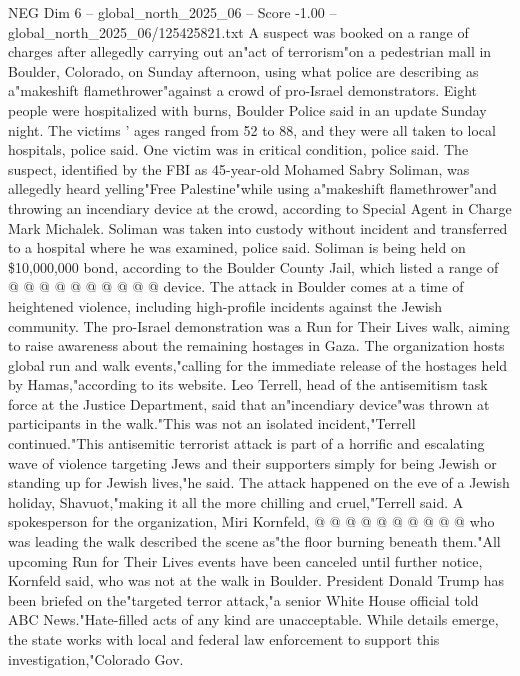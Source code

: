 \begin{textsample}{NEG Dim 6 – global\_north\_2025\_06 – Score -1.00 – global\_north\_2025\_06/125425821.txt}  \label{ex:f6_neg_436}
A suspect was booked on a range of charges after allegedly carrying out an"act of terrorism"on a pedestrian mall in Boulder, Colorado, on Sunday afternoon, using what police are describing as a"makeshift flamethrower"against a crowd of pro-Israel demonstrators.
Eight people were hospitalized with burns, Boulder Police said in an update Sunday night.
The victims ' ages ranged from 52 to 88, and they were all taken to local hospitals, police said.
One victim was in critical condition, police said.
The suspect, identified by the FBI as 45-year-old Mohamed Sabry Soliman, was allegedly heard yelling"Free Palestine"while using a"makeshift flamethrower"and throwing an incendiary device at the crowd, according to Special Agent in Charge Mark Michalek.
Soliman was taken into custody without incident and transferred to a hospital where he was examined, police said.
Soliman is being held on \$10,000,000 bond, according to the Boulder County Jail, which listed a range of @ @ @ @ @ @ @ @ @ @ device.
The attack in Boulder comes at a time of heightened violence, including high-profile incidents against the Jewish community.
The pro-Israel demonstration was a Run for Their Lives walk, aiming to raise awareness about the remaining hostages in Gaza.
The organization hosts global run and walk events,"calling for the immediate release of the hostages held by Hamas,"according to its website.
Leo Terrell, head of the antisemitism task force at the Justice Department, said that an"incendiary device"was thrown at participants in the walk."This was not an isolated incident,"Terrell continued."This antisemitic terrorist attack is part of a horrific and escalating wave of violence targeting Jews and their supporters simply for being Jewish or standing up for Jewish lives,"he said.
The attack happened on the eve of a Jewish holiday, Shavuot,"making it all the more chilling and cruel,"Terrell said.
A spokesperson for the organization, Miri Kornfeld, @ @ @ @ @ @ @ @ @ @ who was leading the walk described the scene as"the floor burning beneath them."All upcoming Run for Their Lives events have been canceled until further notice, Kornfeld said, who was not at the walk in Boulder.
President Donald Trump has been briefed on the"targeted terror attack,"a senior White House official told ABC News."Hate-filled acts of any kind are unacceptable.
While details emerge, the state works with local and federal law enforcement to support this investigation,"Colorado Gov.

\end{textsample}
